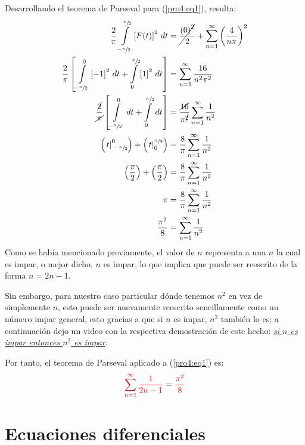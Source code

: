 \begin{multicols}{2}
Desarrollando el teorema de Parseval para (\ref{pro4:eq1}), resulta:
\begin{align*}
    \frac{2}{\pi} \int\limits_{-\sfrac{\pi}{2}}^{\sfrac{\pi}{2}} \left[F(t)\right]^{2} \,dt &= \cancel{\frac{\left(0\right)^{2}}{2}} + \sum_{n=1}^{\infty} \left(\frac{4}{n\pi}\right)^{2}\\
    \frac{2}{\pi} \left[\int\limits_{-\sfrac{\pi}{2}}^{0} \left[-1\right]^{2} \,dt + \int\limits_{0}^{\sfrac{\pi}{2}} \left[1\right]^{2} \,dt\right] &= \sum_{n=1}^{\infty} \frac{16}{n^{2}\pi^{2}}\\
    \frac{\cancel{2}}{\cancel{\pi}} \left[\int\limits_{-\sfrac{\pi}{2}}^{0} \,dt + \int\limits_{0}^{\sfrac{\pi}{2}} \,dt\right] &= \frac{\cancel{16}}{\pi^{\cancel{2}}} \sum_{n=1}^{\infty} \frac{1}{n^{2}}\\
    \left(\left.t\right|_{\sfrac{-\pi}{2}}^{0}\right) + \left(\left.t \right|_{0}^{\sfrac{\pi}{2}}\right) &= \frac{8}{\pi} \sum_{n=1}^{\infty} \frac{1}{n^{2}}\\
    \left(\frac{\pi}{2}\right) + \left(\frac{\pi}{2}\right) &= \frac{8}{\pi} \sum_{n=1}^{\infty} \frac{1}{n^{2}}\\
    \pi &= \frac{8}{\pi} \sum_{n=1}^{\infty} \frac{1}{n^{2}}\\
    \frac{\pi^{2}}{8} &= \sum_{n=1}^{\infty} \frac{1}{n^{2}}
\end{align*}
Como se había mencionado previamente, el valor de $n$ representa a una $n$ la cual es impar, o mejor dicho, $n$ es impar, lo que implica que puede ser reescrito de la forma $n = 2n-1$. 

Sin embargo, para nuestro caso particular dónde tenemos $n^{2}$ en vez de simplemente $n$, esto puede ser nuevamente reescrito sencillamente como un número impar general, esto gracias a que si $n$ es impar, $n^{2}$ también lo es; a continuación dejo un video con la respectiva demostración de este hecho: \href{https://youtu.be/XMB3Aa6SscQ}{\textit{si $n$ es impar entonces $n^{2}$ es impar}}.

Por tanto, el teorema de Parseval aplicado a (\ref{pro4:eq1}) es:
\begin{equation}
    \textcolor{rojo}{\sum_{n=1}^{\infty} \frac{1}{2n-1} = \frac{\pi^{2}}{8}} \label{pro4:res1}
\end{equation}

\section{Ecuaciones diferenciales}


\end{multicols}
